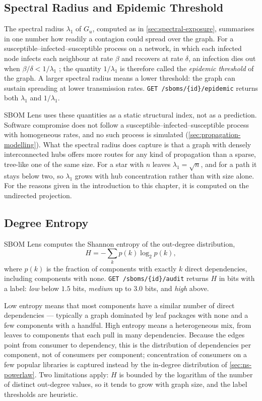 \subsection{Spectral Radius and Epidemic Threshold}
\label{sec:ns-spectral-radius}

The spectral radius \(\lambda_1\) of \(G_u\), computed as in \autoref{sec:spectral-exposure}, summarises in one number how readily a contagion could spread over the graph. For a susceptible--infected--susceptible process on a network, in which each infected node infects each neighbour at rate \(\beta\) and recovers at rate \(\delta\), an infection dies out when \(\beta / \delta < 1/\lambda_1\) \citep{Wang2003}; the quantity \(1/\lambda_1\) is therefore called the \textit{epidemic threshold} of the graph. A larger spectral radius means a lower threshold: the graph can sustain spreading at lower transmission rates. \texttt{GET /sboms/\{id\}/epidemic} returns both \(\lambda_1\) and \(1/\lambda_1\).

SBOM Lens uses these quantities as a static structural index, not as a prediction. Software compromise does not follow a susceptible--infected--susceptible process with homogeneous rates, and no such process is simulated (\autoref{sec:propagation-modelling}). What the spectral radius does capture is that a graph with densely interconnected hubs offers more routes for any kind of propagation than a sparse, tree-like one of the same size. For a star with \(n\) leaves \(\lambda_1 = \sqrt{n}\), and for a path it stays below two, so \(\lambda_1\) grows with hub concentration rather than with size alone. For the reasons given in the introduction to this chapter, it is computed on the undirected projection.


\subsection{Degree Entropy}
\label{sec:ns-entropy}

SBOM Lens computes the Shannon entropy \citep{Shannon1948} of the out-degree distribution,
\[
    H = -\sum_k p(k) \log_2 p(k),
\]
where \(p(k)\) is the fraction of components with exactly \(k\) direct dependencies, including components with none. \texttt{GET /sboms/\{id\}/audit} returns \(H\) in bits with a label: \textit{low} below \(1.5\) bits, \textit{medium} up to \(3.0\) bits, and \textit{high} above.

Low entropy means that most components have a similar number of direct dependencies --- typically a graph dominated by leaf packages with none and a few components with a handful. High entropy means a heterogeneous mix, from leaves to components that each pull in many dependencies. Because the edges point from consumer to dependency, this is the distribution of dependencies per component, not of consumers per component; concentration of consumers on a few popular libraries is captured instead by the in-degree distribution of \autoref{sec:ns-powerlaw}. Two limitations apply: \(H\) is bounded by the logarithm of the number of distinct out-degree values, so it tends to grow with graph size, and the label thresholds are heuristic.



